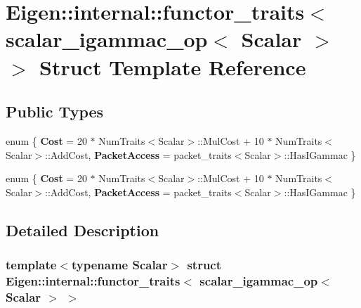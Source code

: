 \hypertarget{struct_eigen_1_1internal_1_1functor__traits_3_01scalar__igammac__op_3_01_scalar_01_4_01_4}{}\section{Eigen\+:\+:internal\+:\+:functor\+\_\+traits$<$ scalar\+\_\+igammac\+\_\+op$<$ Scalar $>$ $>$ Struct Template Reference}
\label{struct_eigen_1_1internal_1_1functor__traits_3_01scalar__igammac__op_3_01_scalar_01_4_01_4}
\subsection*{Public Types}
\begin{DoxyCompactItemize}
\item 
\mbox{\label{struct_eigen_1_1internal_1_1functor__traits_3_01scalar__igammac__op_3_01_scalar_01_4_01_4_aa2986f7ea12b84ab2711c5e9be8ada75}} 
enum \{ {\bfseries Cost} = 20 $\ast$ Num\+Traits$<$Scalar$>$\+:\+:Mul\+Cost + 10 $\ast$ Num\+Traits$<$Scalar$>$\+:\+:Add\+Cost, 
{\bfseries Packet\+Access} = packet\+\_\+traits$<$Scalar$>$\+:\+:Has\+I\+Gammac
 \}
\item 
\mbox{\label{struct_eigen_1_1internal_1_1functor__traits_3_01scalar__igammac__op_3_01_scalar_01_4_01_4_ab7d0921d268fb0bc0e5e75300bf3a654}} 
enum \{ {\bfseries Cost} = 20 $\ast$ Num\+Traits$<$Scalar$>$\+:\+:Mul\+Cost + 10 $\ast$ Num\+Traits$<$Scalar$>$\+:\+:Add\+Cost, 
{\bfseries Packet\+Access} = packet\+\_\+traits$<$Scalar$>$\+:\+:Has\+I\+Gammac
 \}
\end{DoxyCompactItemize}


\subsection{Detailed Description}
\subsubsection*{template$<$typename Scalar$>$\newline
struct Eigen\+::internal\+::functor\+\_\+traits$<$ scalar\+\_\+igammac\+\_\+op$<$ Scalar $>$ $>$}



